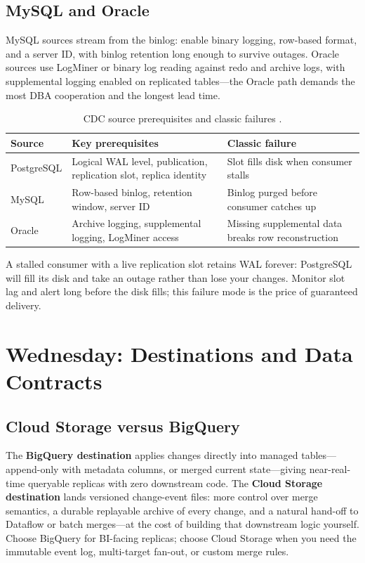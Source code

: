 \subsection{MySQL and Oracle}
MySQL sources stream from the binlog: enable binary logging, row-based format, and a server ID, with binlog retention long enough to survive outages. Oracle sources use LogMiner or binary log reading against redo and archive logs, with supplemental logging enabled on replicated tables---the Oracle path demands the most DBA cooperation and the longest lead time.

\begin{table}[H]
\centering
\small
\begin{tabular}{@{}p{2.8cm}p{5.0cm}p{4.6cm}@{}} \\
\toprule
\textbf{Source} & \textbf{Key prerequisites} & \textbf{Classic failure} \\
\midrule
PostgreSQL & Logical WAL level, publication, replication slot, replica identity & Slot fills disk when consumer stalls \\
MySQL & Row-based binlog, retention window, server ID & Binlog purged before consumer catches up \\
Oracle & Archive logging, supplemental logging, LogMiner access & Missing supplemental data breaks row reconstruction \\
\bottomrule
\end{tabular}
\caption{CDC source prerequisites and classic failures \cite{googleclouddatastreamdocs}.}
\label{tab:ch11-source-prereqs}
\end{table}

\begin{pitfall}
A stalled consumer with a live replication slot retains WAL forever: PostgreSQL will fill its disk and take an outage rather than lose your changes. Monitor slot lag and alert long before the disk fills; this failure mode is the price of guaranteed delivery.
\end{pitfall}

\section{Wednesday: Destinations and Data Contracts}

\subsection{Cloud Storage versus BigQuery}
The \textbf{BigQuery destination} applies changes directly into managed tables---append-only with metadata columns, or merged current state---giving near-real-time queryable replicas with zero downstream code. The \textbf{Cloud Storage destination} lands versioned change-event files: more control over merge semantics, a durable replayable archive of every change, and a natural hand-off to Dataflow or batch merges---at the cost of building that downstream logic yourself. Choose BigQuery for BI-facing replicas; choose Cloud Storage when you need the immutable event log, multi-target fan-out, or custom merge rules.

